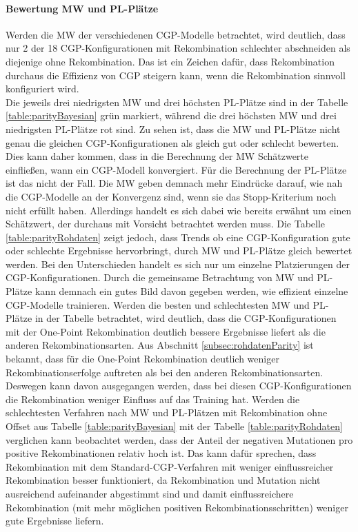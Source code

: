 \paragraph{Bewertung MW und PL-Plätze}
Werden die MW der verschiedenen CGP-Modelle betrachtet, wird deutlich, dass nur 2 der 18 CGP-Konfigurationen mit Rekombination schlechter abschneiden als diejenige ohne Rekombination.
Das ist ein Zeichen dafür, dass Rekombination durchaus die Effizienz von CGP steigern kann, wenn die Rekombination sinnvoll konfiguriert wird.\\
Die jeweils drei niedrigsten MW und drei höchsten PL-Plätze sind in der Tabelle \ref{table:parityBayesian} grün markiert, während die drei höchsten MW und drei niedrigsten PL-Plätze rot sind.
Zu sehen ist, dass die MW und PL-Plätze nicht genau die gleichen CGP-Konfigurationen als gleich gut oder schlecht bewerten.
Dies kann daher kommen, dass in die Berechnung der MW Schätzwerte einfließen, wann ein CGP-Modell konvergiert.
Für die Berechnung der PL-Plätze ist das nicht der Fall.
Die MW geben demnach mehr Eindrücke darauf, wie nah die CGP-Modelle an der Konvergenz sind, wenn sie das Stopp-Kriterium noch nicht erfüllt haben.
Allerdings handelt es sich dabei wie bereits erwähnt um einen Schätzwert, der durchaus mit Vorsicht betrachtet werden muss.
Die Tabelle \ref{table:parityRohdaten} zeigt jedoch, dass Trends ob eine CGP-Konfiguration gute oder schlechte Ergebnisse hervorbringt, durch MW und PL-Plätze gleich bewertet werden.
Bei den Unterschieden handelt es sich nur um einzelne Platzierungen der CGP-Konfigurationen.
Durch die gemeinsame Betrachtung von MW und PL-Plätze kann demnach ein gutes Bild davon gegeben werden, wie effizient einzelne CGP-Modelle trainieren.
Werden die besten und schlechtesten MW und PL-Plätze in der Tabelle betrachtet, wird deutlich, dass die CGP-Konfigurationen mit der One-Point Rekombination deutlich bessere Ergebnisse liefert als die anderen Rekombinationsarten.
Aus Abschnitt \ref{subsec:rohdatenParity} ist bekannt, dass für die One-Point Rekombination deutlich weniger Rekombinationserfolge auftreten als bei den anderen Rekombinationsarten.
Deswegen kann davon ausgegangen werden, dass bei diesen CGP-Konfigurationen die Rekombination weniger Einfluss auf das Training hat.
Werden die schlechtesten Verfahren nach MW und PL-Plätzen mit Rekombination ohne Offset aus Tabelle \ref{table:parityBayesian} mit der Tabelle \ref{table:parityRohdaten} verglichen kann beobachtet werden, dass der Anteil der negativen Mutationen pro positive Rekombinationen relativ hoch ist.
Das kann dafür sprechen, dass Rekombination mit dem Standard-CGP-Verfahren mit weniger einflussreicher Rekombination besser funktioniert, da Rekombination und Mutation nicht ausreichend aufeinander abgestimmt sind und damit einflussreichere Rekombination (mit mehr möglichen positiven Rekombinationsschritten) weniger gute Ergebnisse liefern.
